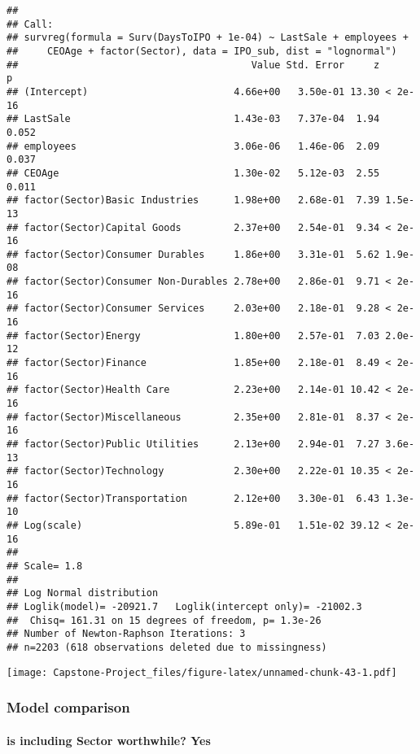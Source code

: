 \documentclass[]{article}
\let\oldparagraph\paragraph
\renewcommand{\paragraph}[1]{\oldparagraph{#1}\mbox{}}
\begin{document}
\begin{verbatim}
## 
## Call:
## survreg(formula = Surv(DaysToIPO + 1e-04) ~ LastSale + employees + 
##     CEOAge + factor(Sector), data = IPO_sub, dist = "lognormal")
##                                        Value Std. Error     z       p
## (Intercept)                         4.66e+00   3.50e-01 13.30 < 2e-16
## LastSale                            1.43e-03   7.37e-04  1.94   0.052
## employees                           3.06e-06   1.46e-06  2.09   0.037
## CEOAge                              1.30e-02   5.12e-03  2.55   0.011
## factor(Sector)Basic Industries      1.98e+00   2.68e-01  7.39 1.5e-13
## factor(Sector)Capital Goods         2.37e+00   2.54e-01  9.34 < 2e-16
## factor(Sector)Consumer Durables     1.86e+00   3.31e-01  5.62 1.9e-08
## factor(Sector)Consumer Non-Durables 2.78e+00   2.86e-01  9.71 < 2e-16
## factor(Sector)Consumer Services     2.03e+00   2.18e-01  9.28 < 2e-16
## factor(Sector)Energy                1.80e+00   2.57e-01  7.03 2.0e-12
## factor(Sector)Finance               1.85e+00   2.18e-01  8.49 < 2e-16
## factor(Sector)Health Care           2.23e+00   2.14e-01 10.42 < 2e-16
## factor(Sector)Miscellaneous         2.35e+00   2.81e-01  8.37 < 2e-16
## factor(Sector)Public Utilities      2.13e+00   2.94e-01  7.27 3.6e-13
## factor(Sector)Technology            2.30e+00   2.22e-01 10.35 < 2e-16
## factor(Sector)Transportation        2.12e+00   3.30e-01  6.43 1.3e-10
## Log(scale)                          5.89e-01   1.51e-02 39.12 < 2e-16
## 
## Scale= 1.8 
## 
## Log Normal distribution
## Loglik(model)= -20921.7   Loglik(intercept only)= -21002.3
##  Chisq= 161.31 on 15 degrees of freedom, p= 1.3e-26 
## Number of Newton-Raphson Iterations: 3 
## n=2203 (618 observations deleted due to missingness)
\end{verbatim}

\texttt{[image: Capstone-Project\_files/figure-latex/unnamed-chunk-43-1.pdf]}

\hypertarget{model-comparison}{%
\subsubsection{Model comparison}\label{model-comparison}}

\hypertarget{is-including-sector-worthwhile-yes}{%
\paragraph{is including Sector worthwhile?
Yes}\label{is-including-sector-worthwhile-yes}}
\end{document}
